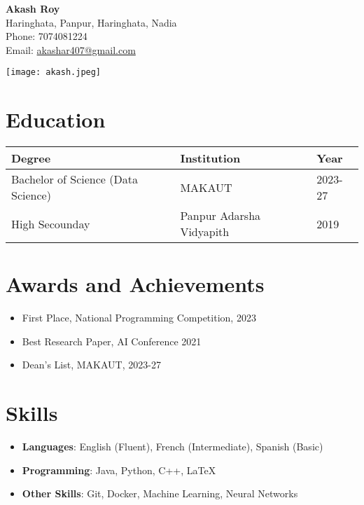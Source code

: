 \documentclass[a4paper,10pt]{article}
\begin{document}
\begin{minipage}[t]{0.7\textwidth}
    \vspace{-20pt}
    \Huge \textbf{Akash Roy} \\
    \normalsize
    Haringhata, Panpur, Haringhata, Nadia \\
    Phone: 7074081224 \\
    Email: \href{mailto:akashar407@gmail.com}{akashar407@gmail.com}
\end{minipage}
\begin{minipage}[t]{0.3\textwidth}
    \begin{flushright}
        \texttt{[image: akash.jpeg]}
    \end{flushright}
\end{minipage}

\vspace{0.5cm}

\section*{Education}
\begin{tabular}{|>{\raggedright}p{}|p{}|p{}|}
    \hline
    \textbf{Degree} & \textbf{Institution} & \textbf{Year} \\
    \hline
    Bachelor of Science (Data Science) &  MAKAUT & 2023-27 \\
    High Secounday &  Panpur Adarsha Vidyapith & 2019 \\
    \hline
\end{tabular}

\vspace{0.5cm}

\section*{Awards and Achievements}
\begin{itemize}
    \item First Place, National Programming Competition, 2023
    \item Best Research Paper, AI Conference 2021
    \item Dean's List, MAKAUT, 2023-27
\end{itemize}

\vspace{0.5cm}

\section*{Skills}
\begin{itemize}
    \item \textbf{Languages}: English (Fluent), French (Intermediate), Spanish (Basic)
    \item \textbf{Programming}: Java, Python, C++, LaTeX
    \item \textbf{Other Skills}: Git, Docker, Machine Learning, Neural Networks
\end{itemize}
\end{document}
